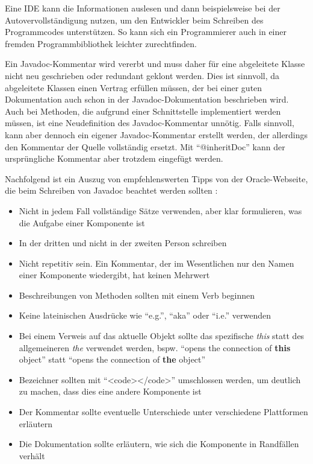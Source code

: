 Eine \ac{IDE} kann die Informationen auslesen und dann beispielsweise bei der Autovervollständigung nutzen, um den Entwickler beim Schreiben des Programmcodes unterstützen. So kann sich ein Programmierer auch in einer fremden Programmbibliothek leichter zurechtfinden.

Ein Javadoc-Kommentar wird vererbt und muss daher für eine abgeleitete Klasse nicht neu geschrieben oder redundant geklont werden. Dies ist sinnvoll, da abgeleitete Klassen einen Vertrag erfüllen müssen, der bei einer guten Dokumentation auch schon in der Javadoc-Dokumentation beschrieben wird. Auch bei Methoden, die aufgrund einer Schnittstelle implementiert werden müssen, ist eine Neudefinition des Javadoc-Kommentar unnötig. Falls sinnvoll, kann aber dennoch ein eigener Javadoc-Kommentar erstellt werden, der allerdings den Kommentar der Quelle vollständig ersetzt. Mit \enquote{@inheritDoc} kann der ursprüngliche Kommentar aber trotzdem eingefügt werden.

Nachfolgend ist ein Auszug von empfehlenswerten Tipps von der Oracle-Webseite, die beim Schreiben von Javadoc beachtet werden sollten \cite{HowtoWriteDocCommentsfortheJavadocTool}:
\begin{itemize}
    \item Nicht in jedem Fall vollständige Sätze verwenden, aber klar formulieren, was die Aufgabe einer Komponente ist
    \item In der dritten und nicht in der zweiten Person schreiben
    \item Nicht repetitiv sein. Ein Kommentar, der im Wesentlichen nur den Namen einer Komponente wiedergibt, hat keinen Mehrwert
    \item  Beschreibungen von Methoden sollten mit einem Verb beginnen
    \item Keine lateinischen Ausdrücke wie \enquote{e.g.}, \enquote{aka} oder \enquote{i.e.} verwenden
    \item Bei einem Verweis auf das aktuelle Objekt sollte das spezifische \textit{this} statt des allgemeineren \textit{the} verwendet werden, bspw. \enquote{opens the connection of \textbf{this} object} statt \enquote{opens the connection of \textbf{the} object}
    \item Bezeichner sollten mit \enquote{<code></code>} umschlossen werden, um deutlich zu machen, dass dies eine andere Komponente ist
    \item Der Kommentar sollte eventuelle Unterschiede unter verschiedene Plattformen erläutern
    \item Die Dokumentation sollte erläutern, wie sich die Komponente in Randfällen verhält
    
\end{itemize}

